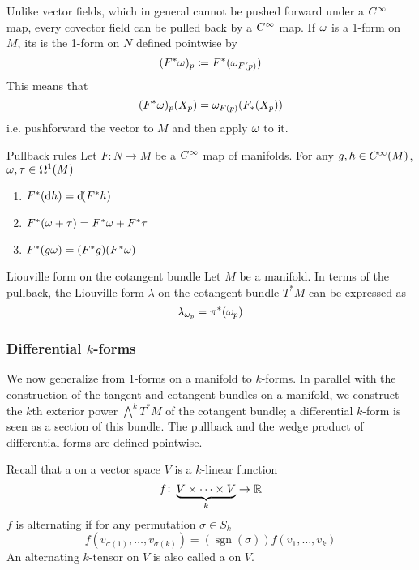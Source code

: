 Unlike vector fields, which in general cannot be pushed forward under a \(C^\infty\) map, every covector field can be pulled back by a \(C^\infty\) map.
If \(\omega\) is a 1-form on \(M\), its  is the 1-form on \(N\) defined pointwise by 
\[
    (F^* \omega)_p \coloneqq F^* (\omega_{F(p)})    
\]
This means that 
\[
    (F^* \omega)_p (X_p) = \omega_{F(p)} (F_* (X_p))
\]
i.e. pushforward the vector to \(M\) and then apply \(\omega\) to it.
\begin{proposition}{Pullback rules}
    Let \(F \colon N \rightarrow M\) be a \(C^\infty\) map of manifolds.
    For any \(g,h \in C^\infty(M)\), \(\omega ,\tau \in \Omega^1(M)\)
    \begin{enumerate}
        \item \(F^* (\dif h) = \dif (F^* h)\)
        \item \(F^*(\omega + \tau) = F^* \omega + F^* \tau\)
        \item \(F^* (g \omega) = (F^* g) (F^* \omega)\)
    \end{enumerate}
\end{proposition}
\begin{example}{Liouville form on the cotangent bundle}{}
    Let \(M\) be a manifold.
    In terms of the pullback, the Liouville form \(\lambda\) on the cotangent bundle \(T^* M\) can be expressed as 
    \[
        \lambda_{\omega_p} = \pi^* (\omega_p)    
    \]
\end{example}

\subsubsection{Differential \(k\)-forms}

We now generalize from 1-forms on a manifold to \(k\)-forms. 
In parallel with the construction of the tangent and cotangent bundles on a manifold, we construct the \(k\)th exterior power \(\bigwedge^k T^* M\) of the cotangent bundle; a differential \(k\)-form is seen as a section of this bundle.
The pullback and the wedge product of differential forms are defined pointwise.

Recall that a  on a vector space \(V\) is a \(k\)-linear function
\[
    f \colon \underbrace{ V \times \cdots \times V}_k \rightarrow \mathbb{R}    
\]
\(f\) is alternating if for any permutation \(\sigma \in S_k\)
\[
    f \left( v_{\sigma(1)}, \dots, v_{\sigma(k)} \right) = (\operatorname{sgn}(\sigma)) f (v_1, \dots, v_k)   
\]
An alternating \(k\)-tensor on \(V\) is also called a  on \(V\).

